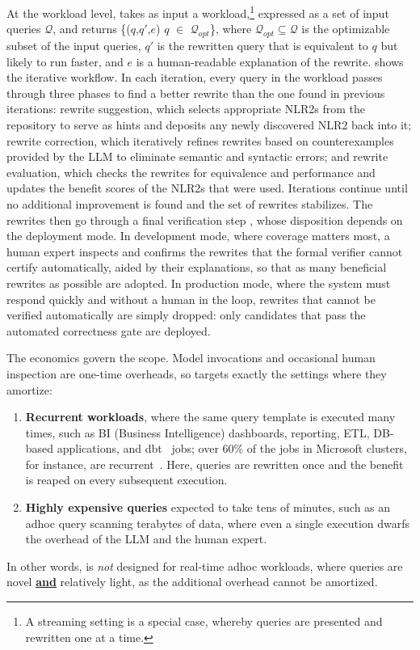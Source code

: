 At the workload level, \genrewrite takes as input a
workload,\footnote{A streaming setting is a special case, whereby
queries are presented and rewritten one at a time.} expressed as a set
of input queries $\mathcal{Q}$, and returns \{($q$,$q'$,$e$) \textbar
$q$ $\in$ $\mathcal{Q}_{opt}$\}, where
$\mathcal{Q}_{opt}\subseteq \mathcal{Q}$ is the optimizable subset of
the input queries, $q'$ is the rewritten query that is equivalent to
$q$ but likely to run faster, and $e$ is a human-readable explanation
of the rewrite.  shows the iterative workflow. In
each iteration, every query in the workload passes through three
phases to find a better rewrite than the one found in previous
iterations: {\small {}} rewrite suggestion, which selects
appropriate NLR2s from the repository to serve as hints and deposits
any newly discovered NLR2 back into it; {\small {}} rewrite
correction, which iteratively refines rewrites based on
counterexamples provided by the LLM to eliminate semantic and
syntactic errors; and {\small {}} rewrite evaluation, which
checks the rewrites for equivalence and performance and updates the
benefit scores of the NLR2s that were used. Iterations continue until
no additional improvement is found and the set of rewrites stabilizes.
The rewrites then go through a final verification step
{\small {}}, whose disposition depends on the deployment
mode. In development mode, where coverage matters most, a human expert
inspects and confirms the rewrites that the formal verifier cannot
certify automatically, aided by their explanations, so that as many
beneficial rewrites as possible are adopted. In production mode, where
the system must respond quickly and without a human in the loop,
rewrites that cannot be verified automatically are simply dropped:
only candidates that pass the automated correctness gate are
deployed.

The economics govern the scope. Model invocations and occasional human
inspection are one-time overheads, so \genrewrite targets exactly the
settings where they amortize:
\begin{enumerate}[leftmargin=0.5cm]
\item \textbf{Recurrent workloads}, where the same query template is
executed many times, such as BI (Business Intelligence) dashboards,
reporting, ETL, DB-based applications, and dbt~\cite{dbt} jobs; over
60\% of the jobs in Microsoft clusters, for instance, are
recurrent~\cite{jindal2018selecting}. Here, queries are rewritten once
and the benefit is reaped on every subsequent execution.
\item \textbf{Highly expensive queries} expected to take tens of
minutes, such as an adhoc query scanning terabytes of data, where even
a single execution dwarfs the overhead of the LLM and the human
expert.
\end{enumerate}
In other words, \genrewrite is \emph{not} designed for real-time adhoc
workloads, where queries are novel \textbf{\underline{and}} relatively
light, as the additional overhead cannot be amortized.

